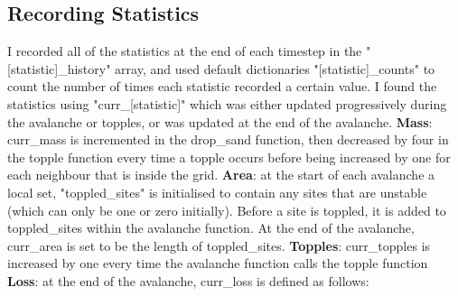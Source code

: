 \documentclass{article}
\begin{document}
\subsection{Recording Statistics}
I recorded all of the statistics at the end of each timestep in the "[statistic]\_history" array, and used default dictionaries "[statistic]\_counts" to count the number of times each statistic recorded a certain value. I found the statistics using "curr\_[statistic]" which was either updated progressively during the avalanche or topples, or was updated at the end of the avalanche.
\newline
\textbf{Mass}: curr\_mass is incremented in the drop\_sand function, then decreased by four in the topple function every time a topple occurs before being increased by one for each neighbour that is inside the grid.
\newline
\newline
\textbf{Area}: at the start of each avalanche a local set, "toppled\_sites" is initialised to contain any sites that are unstable (which can only be one or zero initially). Before a site  is toppled, it is added to toppled\_sites within the avalanche function. At the end of the avalanche, curr\_area is set to be the length of toppled\_sites. 
\newline
\newline
\textbf{Topples}: curr\_topples is increased by one every time the avalanche function calls the topple function
\newline
\newline
\textbf{Loss}: at the end of the avalanche, curr\_loss is defined as follows: 
\end{document}
